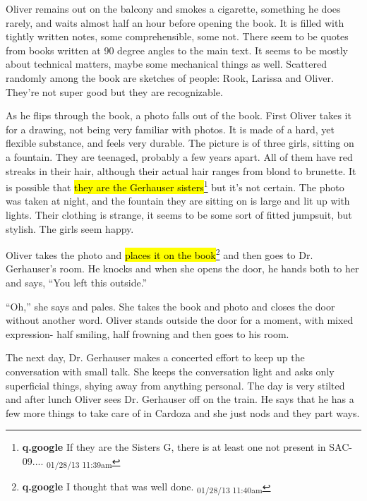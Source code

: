 Oliver remains out on the balcony and smokes a cigarette, something he does rarely, and waits almost half an hour before opening the book.  It is filled with tightly written notes, some comprehensible, some not.  There seem to be quotes from books written at 90 degree angles to the main text.  It seems to be mostly about technical matters, maybe some mechanical things as well.  Scattered randomly among the book are sketches of people: Rook, Larissa and Oliver.  They're not super good but they are recognizable.



As he flips through the book, a photo falls out of the book.  First Oliver takes it for a drawing, not being very familiar with photos.  It is made of a hard, yet flexible substance, and feels very durable.  The picture is of three girls, sitting on a fountain.  They are teenaged, probably a few years apart.  All of them have red streaks in their hair, although their actual hair ranges from blond to brunette.  It is possible that \hl{they are the Gerhauser sisters}\footnote{\textbf{q.google }If they are the Sisters G, there is at least one not present in SAC-09.... \textsubscript{01/28/13 11:39am}} but it's not certain.  The photo was taken at night, and the fountain they are sitting on is large and lit up with lights.  Their clothing is strange, it seems to be some sort of fitted jumpsuit, but stylish.  The girls seem happy.



Oliver takes the photo and \hl{places it on the book}\footnote{\textbf{q.google }I thought that was well done. \textsubscript{01/28/13 11:40am}} and then goes to Dr. Gerhauser's room.  He knocks and when she opens the door, he hands both to her and says, ``You left this outside.''

``Oh,'' she says and pales.  She takes the book and photo and closes the door without another word.  Oliver stands outside the door for a moment, with mixed expression- half smiling, half frowning and then goes to his room.



The next day, Dr. Gerhauser makes a concerted effort to keep up the conversation with small talk.  She keeps the conversation light and asks only superficial things, shying away from anything personal.  The day is very stilted and after lunch Oliver sees Dr. Gerhauser off on the train.  He says that he has a few more things to take care of in Cardoza and she just nods and they part ways.



